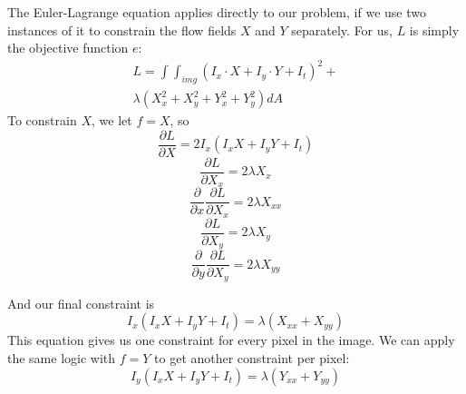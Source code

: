 \documentclass[10pt,twocolumn,letterpaper]{article}
\begin{document}
The Euler-Lagrange equation applies directly to our problem, if we use two instances of it to constrain the flow fields $X$ and $Y$ separately.  For us, $L$ is simply the objective function $e$: 
\begin{multline} \label{eq:eulerL2}
L =  \int \int_{img} (I_x \cdot X + I_y \cdot Y + I_t)^2 + \\
\lambda ( X_x^2 + X_y^2 + Y_x^2 + Y_y^2 ) dA 
\end{multline}
To constrain $X$, we let $f=X$, so 
\begin{equation} \label{eq:eulerPlug1}
\frac{\partial L}{\partial X} = 2I_x (I_x X + I_y Y + I_t)
\end{equation}
\begin{equation} \label{eq:eulerPlug2}
\frac{\partial L}{\partial X_x} = 2 \lambda X_x
\end{equation}
\begin{equation} \label{eq:eulerPlug3}
\frac{\partial}{\partial x} \frac{\partial L}{\partial X_x} = 2 \lambda X_{xx}
\end{equation}
\begin{equation} \label{eq:eulerPlug4}
\frac{\partial L}{\partial X_y} = 2 \lambda X_y
\end{equation}
\begin{equation} \label{eq:eulerPlug5}
\frac{\partial}{\partial y} \frac{\partial L}{\partial X_y} = 2 \lambda X_{yy}
\end{equation}

And our final constraint is
\begin{equation} \label{eq:eulerPlug6}
I_x (I_x X + I_y Y + I_t) = \lambda (X_{xx} + X_{yy})
\end{equation}
This equation gives us one constraint for every pixel in the image.  We can apply the same logic with $f=Y$ to get another constraint per pixel:
\begin{equation} \label{eq:eulerPlug7}
I_y (I_x X + I_y Y + I_t) = \lambda (Y_{xx} + Y_{yy})
\end{equation}
\end{document}
